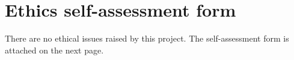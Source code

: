 \documentclass[../../report.tex]{subfiles}
\begin{document}
\chapter{Ethics self-assessment form}
\label{app:ethics_form}
There are no ethical issues raised by this project. 
The self-assessment form is attached on the next page.

\end{document}
